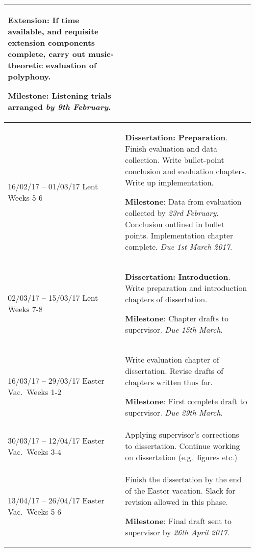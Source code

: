 \documentclass[12pt,a4paper,twoside]{article}
\begin{document}
\begin{longtable}{ p{4cm} | p{11cm} }
\textbf{Extension}: If time available, and requisite extension components
complete, carry out music-theoretic evaluation of polyphony.
\newline\vspace{0mm}

\textbf{Milestone}: Listening trials arranged \emph{by 9th February}.
\\ \hline

16/02/17 -- 01/03/17 Lent Weeks 5-6 & \textbf{Dissertation: Preparation}.
Finish evaluation and data collection. Write bullet-point conclusion and 
evaluation chapters. Write up implementation. \newline\vspace{0mm}

\textbf{Milestone}: Data from evaluation collected by \emph{23rd February}.
Conclusion outlined in bullet points. Implementation chapter
complete. \emph{Due 1st March 2017}.
\\ \hline

02/03/17 -- 15/03/17 Lent Weeks 7-8 & \textbf{Dissertation: Introduction}.
Write preparation and introduction chapters of dissertation.
\newline\vspace{0mm}

\textbf{Milestone}: Chapter drafts to supervisor. \emph{Due 15th March}.
\\ \hline

16/03/17 -- 29/03/17 Easter Vac.\ Weeks 1-2 & Write evaluation chapter of
dissertation. Revise drafts of chapters written thus far. \newline\vspace{0mm}

\textbf{Milestone}: First complete draft to supervisor. \emph{Due 29th March}.
\\ \hline

30/03/17 -- 12/04/17 Easter Vac.\ Weeks 3-4 & 
Applying supervisor's corrections to dissertation. Continue working on
dissertation (e.g.\ figures etc.)
\\ \hline

13/04/17 -- 26/04/17 Easter Vac.\ Weeks 5-6 & 
Finish the dissertation by the end of the Easter vacation. Slack for revision
allowed in this phase. \newline\vspace{0mm}

\textbf{Milestone}: Final draft sent to supervisor by \emph{26th April 2017}.
\\ \hline
\end{longtable}

\end{document}

